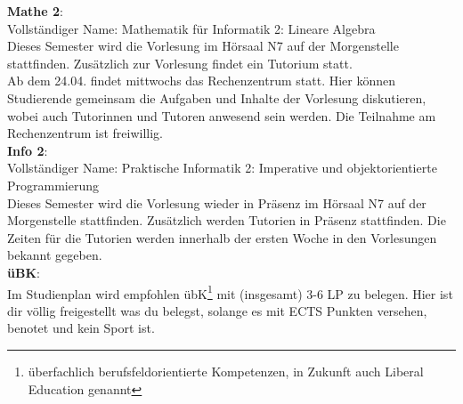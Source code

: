 \textbf{Mathe 2}:\\
Vollständiger Name: Mathematik für Informatik 2: Lineare Algebra\\
Dieses Semester wird die Vorlesung im Hörsaal N7 auf der Morgenstelle stattfinden.
Zusätzlich zur Vorlesung findet ein Tutorium statt. \\
Ab dem 24.04. findet mittwochs das Rechenzentrum statt. Hier können Studierende gemeinsam die Aufgaben und Inhalte der Vorlesung diskutieren,
wobei auch Tutorinnen und Tutoren anwesend sein werden. Die Teilnahme am Rechenzentrum ist freiwillig.\\

\textbf{Info 2}:\\
Vollständiger Name: Praktische Informatik 2: Imperative und objektorientierte Programmierung\\
Dieses Semester wird die Vorlesung wieder in Präsenz im Hörsaal N7 auf der Morgenstelle stattfinden.
Zusätzlich werden Tutorien in Präsenz stattfinden.
Die Zeiten für die Tutorien werden innerhalb der ersten Woche in den Vorlesungen bekannt gegeben.\\

\textbf{üBK}:\\
Im Studienplan wird empfohlen übK\footnote{überfachlich berufsfeldorientierte Kompetenzen, in Zukunft auch Liberal Education genannt}
mit (insgesamt) 3-6 LP zu belegen. Hier ist dir völlig freigestellt was du belegst, solange es mit ECTS Punkten versehen, benotet und kein Sport ist.\\
